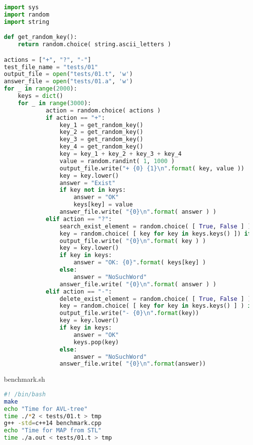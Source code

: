 \begin{lstlisting}[language=Python]
import sys
import random
import string

def get_random_key():
    return random.choice( string.ascii_letters )

actions = ["+", "?", "-"]
test_file_name = "tests/01"
output_file = open("tests/01.t", 'w')
answer_file = open("tests/01.a", 'w')
for _ in range(2000):
    keys = dict()
    for _ in range(3000):
            action = random.choice( actions )
            if action == "+":
                key_1 = get_random_key()
                key_2 = get_random_key()
                key_3 = get_random_key()
                key_4 = get_random_key()
                key = key_1 + key_2 + key_3 + key_4
                value = random.randint( 1, 1000 )
                output_file.write("+ {0} {1}\n".format( key, value ))
                key = key.lower()
                answer = "Exist"
                if key not in keys:
                    answer = "OK"
                    keys[key] = value
                answer_file.write( "{0}\n".format( answer ) )
            elif action == "?":
                search_exist_element = random.choice( [ True, False ] )
                key = random.choice( [ key for key in keys.keys() ]) if search_exist_element and len( keys.keys() ) > 0 else get_random_key()
                output_file.write( "{0}\n".format( key ) )
                key = key.lower()
                if key in keys:
                    answer = "OK: {0}".format( keys[key] )
                else:
                    answer = "NoSuchWord"
                answer_file.write( "{0}\n".format( answer ) )
            elif action == "-":
                delete_exist_element = random.choice( [ True, False ] )
                key = random.choice( [ key for key in keys.keys() ] ) if search_exist_element and len( keys.keys() ) > 0 else get_random_key()
                output_file.write("- {0}\n".format(key))
                key = key.lower()
                if key in keys:
                    answer = "OK"
                    keys.pop(key)
                else:
                    answer = "NoSuchWord"
                answer_file.write( "{0}\n".format(answer))
\end{lstlisting}
benchmark.sh
\begin{lstlisting}[language=Bash]
#! /bin/bash
make
echo "Time for AVL-tree"
time ./*2 < tests/01.t > tmp
g++ -std=c++14 benchmark.cpp
echo "Time for MAP from STL"
time ./a.out < tests/01.t > tmp
\end{lstlisting}
\pagebreak
